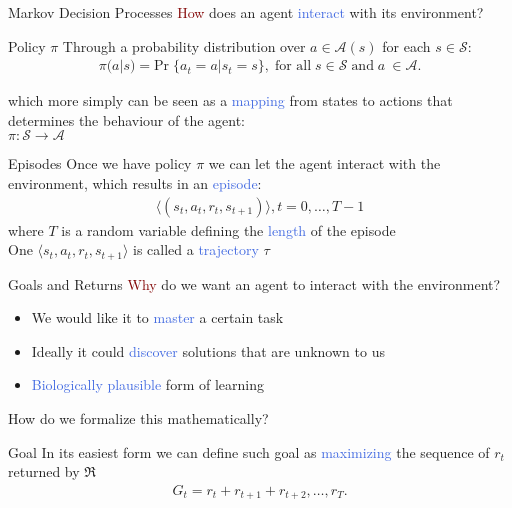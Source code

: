 \documentclass{beamer}
\begin{document}
\begin{frame}{Markov Decision Processes}
	\textcolor{Maroon}{How} does an agent \textcolor{RoyalBlue}{interact} with its environment?
	
	\begin{block}{Policy $\pi$}		
		Through a probability distribution over $a \in \mathcal{A}(s)$ for each $s \in \mathcal{S}$:
		\centering
		\begin{align*}
			\pi(a|s) = \text{Pr}\; \{a_t = a | s_t = s\}, \; \text{for all}\; s \in \mathcal{S}\; \text{and}\; a\ \in \mathcal{A}. 
		\end{align*}

	\end{block}
	
	which more simply can be seen as a \textcolor{RoyalBlue}{mapping} from states to actions that determines the behaviour of the agent: \\ 
	\centering $\pi: \mathcal{S}\rightarrow \mathcal{A}$ \\	
\end{frame}

\begin{frame}{Episodes}
	Once we have policy $\pi$ we can let the agent interact with the environment, which results in an \textcolor{RoyalBlue}{episode}:
	\centering
	\begin{align*}
		\langle(s_t,a_t,r_t,s_{t+1})\rangle, t=0,\ldots,T-1
	\end{align*}
	where $T$ is a random variable defining the \textcolor{RoyalBlue}{length} of the episode \\

	\bigskip
	One $\langle s_t,a_t,r_t,s_{t+1} \rangle$ is called a \textcolor{RoyalBlue}{trajectory} $\tau$
\end{frame}



\begin{frame}{Goals and Returns}
	\textcolor{Maroon}{Why} do we want an agent to interact with the environment?
	\begin{itemize}
		\item We would like it to \textcolor{RoyalBlue}{master} a certain task
		\item Ideally it could \textcolor{RoyalBlue}{discover} solutions that are unknown to us
		\item \textcolor{RoyalBlue}{Biologically plausible} form of learning
	\end{itemize}

	How do we formalize this mathematically?

	\begin{block}{Goal}
		In its easiest form we can define such goal as \textcolor{RoyalBlue}{maximizing} the sequence of $r_t$ returned by $\Re$
		\begin{align*}
			G_t = r_t + r_{t+1} + r_{t+2}, \ldots, r_T.
		\end{align*}
	\end{block}

\end{frame}
\end{document}
